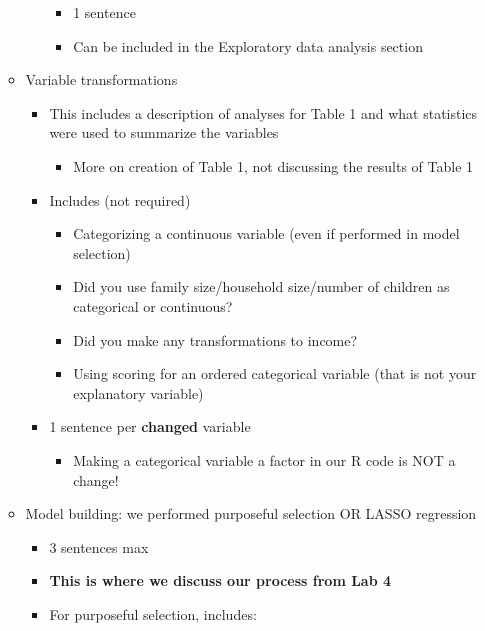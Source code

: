\documentclass[
  letterpaper,
  DIV=11,
  numbers=noendperiod]{scrartcl}
\providecommand{\tightlist}{%
  \setlength{\itemsep}{0pt}\setlength{\parskip}{0pt}}\usepackage{longtable,booktabs,array}
\begin{document}
\begin{itemize}
\begin{itemize}
\begin{itemize}
      \begin{itemize}
      \tightlist
      \item
        1 sentence
      \item
        Can be included in the Exploratory data analysis section
      \end{itemize}
    \end{itemize}
  \item
    Variable transformations

    \begin{itemize}
    \tightlist
    \item
      This includes a description of analyses for Table 1 and what
      statistics were used to summarize the variables

      \begin{itemize}
      \tightlist
      \item
        More on creation of Table 1, not discussing the results of Table
        1
      \end{itemize}
    \item
      Includes (not required)

      \begin{itemize}
      \tightlist
      \item
        Categorizing a continuous variable (even if performed in model
        selection)
      \item
        Did you use family size/household size/number of children as
        categorical or continuous?
      \item
        Did you make any transformations to income?
      \item
        Using scoring for an ordered categorical variable (that is not
        your explanatory variable)
      \end{itemize}
    \item
      1 sentence per \textbf{changed} variable

      \begin{itemize}
      \tightlist
      \item
        Making a categorical variable a factor in our R code is NOT a
        change!
      \end{itemize}
    \end{itemize}
  \item
    Model building: we performed purposeful selection OR LASSO
    regression

    \begin{itemize}
    \tightlist
    \item
      3 sentences max
    \item
      {\textbf{This is where we discuss our process from Lab 4}}
    \item
      For purposeful selection, includes:


\end{itemize}
\end{itemize}
\end{itemize}
\end{document}

